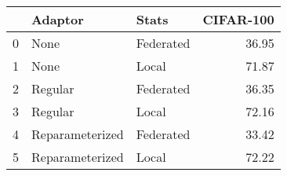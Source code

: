 \begin{tabular}{lllr}
\toprule
 & Adaptor & Stats & CIFAR-100 \\
\midrule
0 & None & Federated & 36.95 \\
1 & None & Local & 71.87 \\
2 & Regular & Federated & 36.35 \\
3 & Regular & Local & 72.16 \\
4 & Reparameterized & Federated & 33.42 \\
5 & Reparameterized & Local & 72.22 \\
\bottomrule
\end{tabular}

